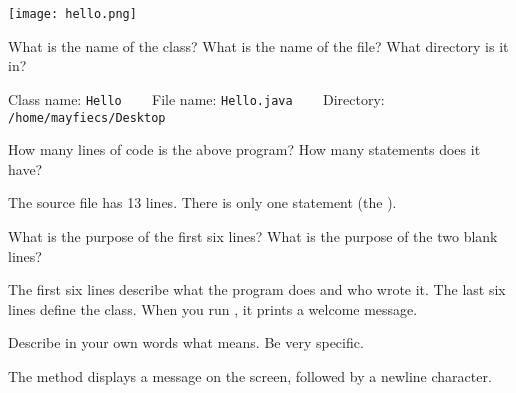 
\begin{center}
\texttt{[image: hello.png]}
\end{center}



\Q What is the name of the class?
What is the name of the file?
What directory is it in?

\begin{answer}
Class name: \texttt{Hello} ~~~
File name: \texttt{Hello.java} ~~~
Directory: \texttt{/home/mayfiecs/Desktop}
\end{answer}


\Q How many lines of code is the above program?
How many statements does it have?

\begin{answer}
The source file has 13 lines.
There is only one statement (the ).
\end{answer}


\Q What is the purpose of the first six lines?
What is the purpose of the two blank lines?

\begin{answer}
The first six lines describe what the program does and who wrote it.
The last six lines define the  class.
When you run , it prints a welcome message.
\end{answer}


\Q Describe in your own words what  means. Be very specific.

\begin{answer}
The  method displays a message on the screen, followed by a newline character.
\end{answer}
